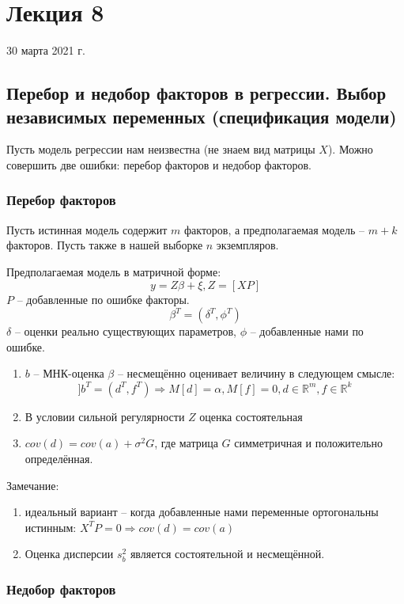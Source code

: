 \documentclass[main.tex]{subfiles}
\begin{document}
\section{Лекция 8}
30 марта 2021 г. \\

\subsection{Перебор и недобор факторов в регрессии. Выбор независимых переменных (спецификация модели)}

Пусть модель регрессии нам неизвестна (не знаем вид матрицы $ X $).
Можно совершить две ошибки: перебор факторов и недобор факторов.

\subsubsection{ Перебор факторов }
Пусть истинная модель содержит $ m $ факторов, а предполагаемая модель -- $ m + k $ факторов.
Пусть также в нашей выборке $ n $ экземпляров.

Предполагаемая модель в матричной форме:
\[ y = Z \beta + \xi, Z = [ X P ] \]
$ P $ -- добавленные по ошибке факторы.
\[ \beta^T = ( \delta^T, \phi^T ) \]
$ \delta $ -- оценки реально существующих параметров, $ \phi $ -- добавленные нами по ошибке.

\begin{enumerate}[noitemsep]
    \item $ b $ -- МНК-оценка $ \beta $ -- несмещённо оценивает величину в следующем смысле:
    \[ ] b^T = (d^T, f^T) \Rightarrow M[d] = \alpha, M[f] = 0, d \in \mathds{R}^m, f \in \mathds{R}^k \]
    \item В условии сильной регулярности $ Z $ оценка состоятельная
    \item $ cov(d) = cov(a) + \sigma^2 G $, где матрица $ G $ симметричная и положительно определённая.
\end{enumerate}

Замечание:

\begin{enumerate}[noitemsep]
    \item идеальный вариант -- когда добавленные нами переменные ортогональны истинным: $ X^T P = 0 \Rightarrow cov(d) = cov(a) $
    \item Оценка дисперсии $ s^2_b $ является состоятельной и несмещённой.
\end{enumerate}

\subsubsection{ Недобор факторов }
\end{document}
